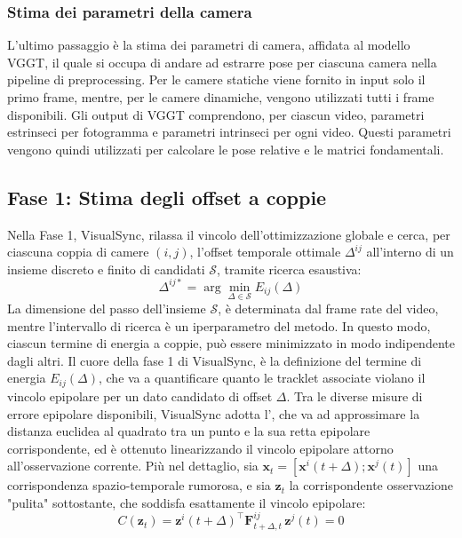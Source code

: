 \subsubsection{Stima dei parametri della camera}
L'ultimo passaggio è la stima dei parametri di camera, affidata al modello VGGT, il quale si occupa di andare ad estrarre pose per ciascuna camera nella pipeline di preprocessing. Per le camere statiche viene fornito in input solo il primo frame, mentre, per le camere dinamiche, vengono utilizzati tutti i frame disponibili. Gli output di VGGT comprendono, per ciascun video, parametri estrinseci per fotogramma e parametri intrinseci per ogni video. Questi parametri vengono quindi utilizzati per calcolare le pose relative e le matrici fondamentali.


\subsection{Fase 1: Stima degli offset a coppie}
Nella Fase 1, VisualSync, rilassa il vincolo dell'ottimizzazione globale e cerca, per ciascuna coppia di camere $(i, j)$, l'offset temporale ottimale $\Delta^{ij}$ all'interno di un insieme discreto e finito di candidati $\mathcal{S}$, tramite ricerca esaustiva:
\begin{equation}
\Delta^{ij*} = \arg\min_{\Delta \in \mathcal{S}} E_{ij}(\Delta)
\end{equation}
La dimensione del passo dell'insieme $\mathcal{S}$, è determinata dal frame rate del video, mentre l'intervallo di ricerca è un iperparametro del metodo. In questo modo, ciascun termine di energia a coppie, può essere minimizzato in modo indipendente dagli altri.
Il cuore della fase 1 di VisualSync, è la definizione del termine di energia $E_{ij}(\Delta)$, che va a quantificare quanto le tracklet associate violano il vincolo epipolare per un dato candidato di offset $\Delta$. Tra le diverse misure di errore epipolare disponibili, VisualSync adotta l', che va ad approssimare la distanza euclidea al quadrato tra un punto e la sua retta epipolare corrispondente, ed è ottenuto linearizzando il vincolo epipolare attorno all'osservazione corrente.
Più nel dettaglio, sia $\mathbf{x}_t = [\mathbf{x}^i(t+\Delta); \mathbf{x}^j(t)]$ una corrispondenza spazio-temporale rumorosa, e sia $\mathbf{z}_t$ la corrispondente osservazione "pulita" sottostante, che soddisfa esattamente il vincolo epipolare:
\begin{equation}
C(\mathbf{z}_t) = \mathbf{z}^i(t+\Delta)^\top \mathbf{F}^{ij}_{t+\Delta,t}\, 
\mathbf{z}^j(t) = 0
\end{equation}
